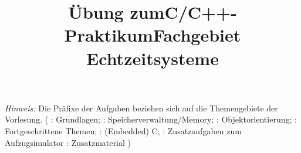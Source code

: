 
\title{Übung zum\linebreak[1]C/C++-Praktikum\linebreak[1] Fachgebiet Echtzeitsysteme}

\setcounter{section}{0}



\maketitle

\noindent\emph{Hinweis:} Die Präfixe der Aufgaben beziehen sich auf die Themengebiete der Vorlesung. (
\ExercisePrefixBasics{}: Grundlagen; 
\ExercisePrefixMemory{}: Speicherverwaltung/Memory;
\ExercisePrefixObjectOrientation{}: Objektorientierung;
\ExercisePrefixAdvanced{}: Fortgeschrittene Themen;
\ExercisePrefixEmbeddedC{}: (Embedded) C;
\ExercisePrefixElevator{}: Zusatzaufgaben zum Aufzugsimulator
\ExercisePrefixAdditionalInformation{}: Zusatzmaterial
)
\setcounter{tocdepth}{1}
\setlength\cftsecnumwidth{10em}
\setlength\cftbeforesecskip{.1em} %
\tableofcontents

\vspace*{\fill}
\cclicense

\newpage






\newpage

\newpage

\newpage


\newpage
{}

\newpage

\newpage

\newpage


\newpage
{}

\newpage

\newpage

\newpage


\newpage
{}

\newpage

\newpage

\newpage

\newpage

\newpage

\newpage

\newpage


